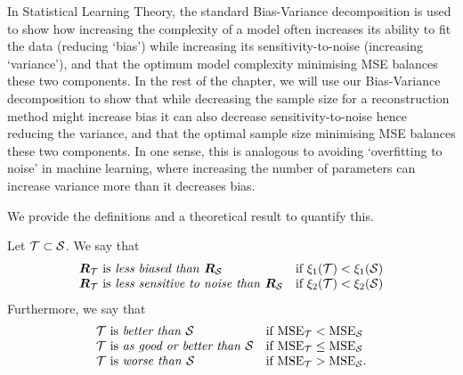 In Statistical Learning Theory, the standard Bias-Variance decomposition is used to show how increasing the complexity of a model often increases its ability to fit the data (reducing `bias') while increasing its sensitivity-to-noise (increasing `variance'), and that the optimum model complexity minimising MSE balances these two components. In the rest of the chapter, we will use our Bias-Variance decomposition to show that while decreasing the sample size for a reconstruction method might increase bias it can also decrease sensitivity-to-noise hence reducing the variance, and that the optimal sample size minimising MSE balances these two components. In one sense, this is analogous to avoiding `overfitting to noise' in machine learning, where increasing the number of parameters can increase variance more than it decreases bias.

We provide the definitions and a theoretical result to quantify this. %

\begin{defn}
Let $\mathcal{T} \subset \mathcal{S}$. We say that 
\begin{align}
    \begin{array}{l l}
        \bm{R}_{\mathcal{T}} \text{ is \emph{less biased than }} \bm{R}_{\mathcal{S}}  & \text{if } \xi_{1}(\mathcal{T}) < \xi_{1}(\mathcal{S}) \\
        \bm{R}_{\mathcal{T}} \text{ is \emph{less sensitive to noise than }} \bm{R}_{\mathcal{S}}  & \text{if } \xi_{2}(\mathcal{T}) < \xi_{2}(\mathcal{S})  
    \end{array}
\end{align}
Furthermore, we say that
\begin{align}
    \begin{array}{l l}
        \mathcal{T} \text{ is \emph{better than} }\mathcal{S} &\text{if } \textrm{MSE}_{\mathcal{T}} < \textrm{MSE}_{\mathcal{S}} \\
        \mathcal{T} \text{ is \emph{as good or better than} }\mathcal{S} &\text{if } \textrm{MSE}_{\mathcal{T}} \leq \textrm{MSE}_{\mathcal{S}} \\
        \mathcal{T} \text{ is \emph{worse than} }\mathcal{S} &\text{if } \textrm{MSE}_{\mathcal{T}} > \textrm{MSE}_{\mathcal{S}}.
    \end{array}
\end{align}
\end{defn}


